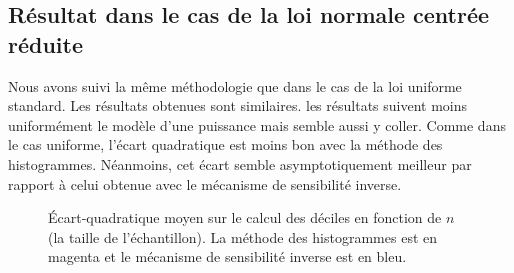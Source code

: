 \subsection{Résultat dans le cas de la loi normale centrée réduite}


Nous avons suivi la même méthodologie que dans le cas de la loi uniforme standard. Les résultats obtenues sont similaires. les résultats suivent moins uniformément le modèle d'une puissance mais semble aussi y coller. Comme dans le cas uniforme, l'écart quadratique est moins bon avec la méthode des histogrammes. Néanmoins, cet écart semble asymptotiquement meilleur par rapport à celui obtenue avec le mécanisme de sensibilité inverse. 

\begin{figure}[H]
    \centering
    \hfill
    \hfill
    \caption{Écart-quadratique moyen sur le calcul des déciles en fonction de \(n\) (la taille de l'échantillon). La méthode des histogrammes est en {\color{magenta} magenta} et le mécanisme de sensibilité inverse est en {\color{blue} bleu}.}
\end{figure}




